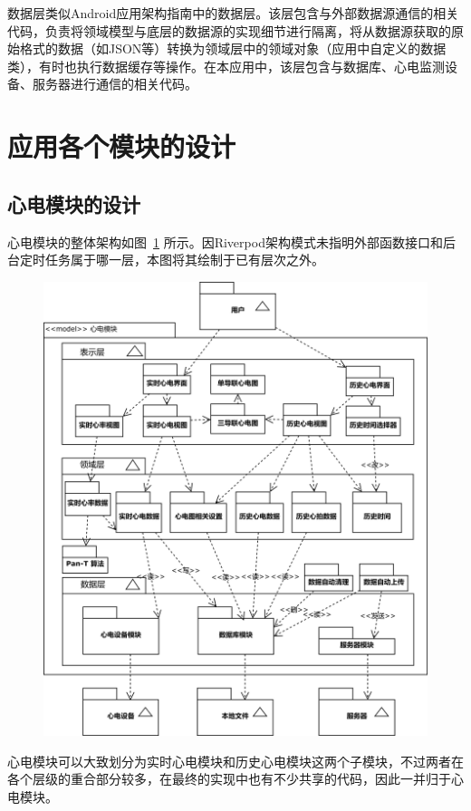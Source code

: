 数据层类似Android应用架构指南中的数据层。该层包含与外部数据源通信的相关代码，负责将领域模型与底层的数据源的实现细节进行隔离，将从数据源获取的原始格式的数据（如JSON等）转换为领域层中的领域对象（应用中自定义的数据类），有时也执行数据缓存等操作。在本应用中，该层包含与数据库、心电监测设备、服务器进行通信的相关代码。


\section{应用各个模块的设计}\label{sec:app-design}

\subsection{心电模块的设计}\label{subsec:ecg-design}

心电模块的整体架构如图~\ref{fig:model-ecg} 所示。因Riverpod架构模式未指明外部函数接口和后台定时任务属于哪一层，本图将其绘制于已有层次之外。

\begin{figure}[ht]
    \centering
    \includegraphics[width=.8\textwidth]{../assets/model-ecg.drawio}
    \label{fig:model-ecg}
\end{figure}

心电模块可以大致划分为实时心电模块和历史心电模块这两个子模块，不过两者在各个层级的重合部分较多，在最终的实现中也有不少共享的代码，因此一并归于心电模块。


